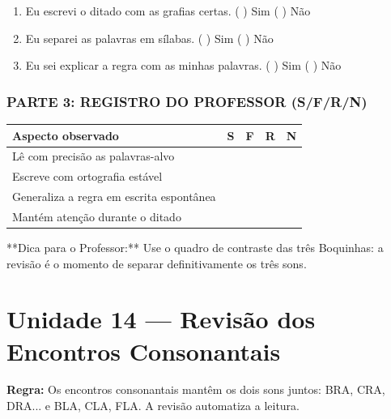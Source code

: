 \begin{exercicio}
\begin{enumerate}[label=\alph*)]
  \item Eu escrevi o ditado com as grafias certas.  \quad ( ) Sim   ( ) Não

  \item Eu separei as palavras em sílabas.  \quad ( ) Sim   ( ) Não

  \item Eu sei explicar a regra com as minhas palavras.  \quad ( ) Sim   ( ) Não

\end{enumerate}

\subsection*{PARTE 3: REGISTRO DO PROFESSOR (S/F/R/N)}

\begin{center}
\renewcommand{\arraystretch}{1.4}
\begin{tabular}{@{}p{9cm}cccc@{}}
\toprule
Aspecto observado & S & F & R & N \\
\midrule
Lê com precisão as palavras-alvo & & & & \\
Escreve com ortografia estável & & & & \\
Generaliza a regra em escrita espontânea & & & & \\
Mantém atenção durante o ditado & & & & \\
\bottomrule\end{tabular}\end{center}

\end{exercicio}

\begin{dica}
**Dica para o Professor:** Use o quadro de contraste das três Boquinhas: a revisão é o momento de separar definitivamente os três sons.
\end{dica}


\chapter{Unidade 14 --- Revisão dos Encontros Consonantais}


\textbf{Regra:} Os encontros consonantais mantêm os dois sons juntos: BRA, CRA, DRA... e BLA, CLA, FLA. A revisão automatiza a leitura.

